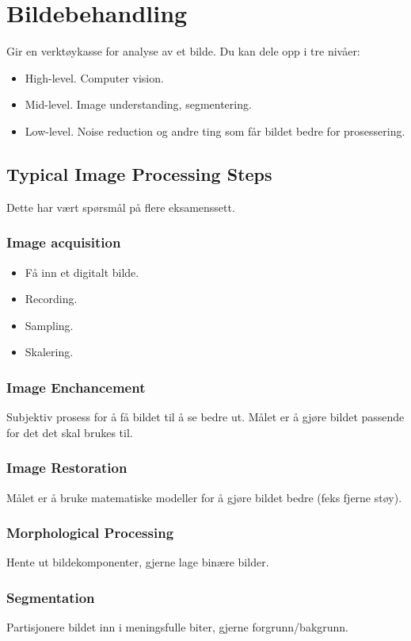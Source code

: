 \section{Bildebehandling}
Gir en verktøykasse for analyse av et bilde. Du kan dele opp i tre nivåer:
\begin{itemize}
    \item High-level. Computer vision.
    \item Mid-level. Image understanding, segmentering.
    \item Low-level. Noise reduction og andre ting som får bildet bedre for prosessering.
\end{itemize}
\subsection{Typical Image Processing Steps}
Dette har vært spørsmål på flere eksamenssett.
\subsubsection{Image acquisition}
\begin{itemize}
    \item Få inn et digitalt bilde.
    \item Recording.
    \item Sampling.
    \item Skalering.
\end{itemize}

\subsubsection{Image Enchancement}
Subjektiv prosess for å få bildet til å se bedre ut. Målet er å gjøre bildet passende for det det skal brukes til.

\subsubsection{Image Restoration}
Målet er å bruke matematiske modeller for å gjøre bildet bedre (feks fjerne støy).

\subsubsection{Morphological Processing}
Hente ut bildekomponenter, gjerne lage binære bilder.

\subsubsection{Segmentation}
Partisjonere bildet inn i meningsfulle biter, gjerne forgrunn/bakgrunn.

